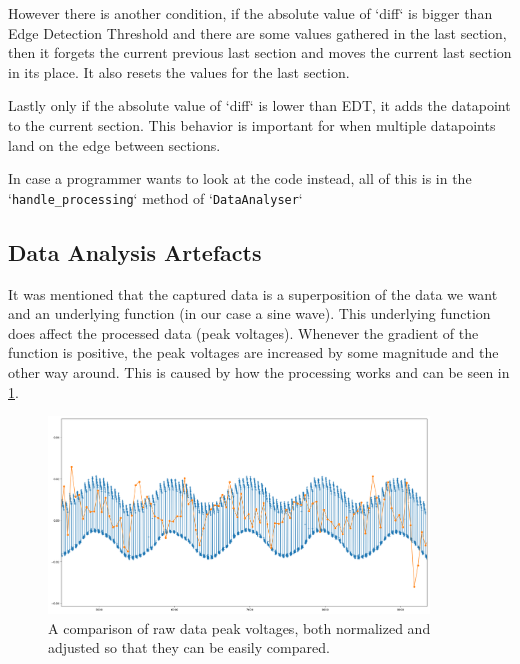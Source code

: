 \documentclass[a4paper, 10pt]{article}
\begin{document}
However there is another condition, if the absolute value of `diff` is bigger than Edge Detection Threshold and there are some values gathered in the last section, then it forgets the current previous last section and moves the current last section in its place.
It also resets the values for the last section.

Lastly only if the absolute value of `diff` is lower than EDT, it adds the datapoint to the current section.
This behavior is important for when multiple datapoints land on the edge between sections.

In case a programmer wants to look at the code instead, all of this is in the `\lstinline{handle_processing}` method of `\lstinline{DataAnalyser}`

\subsection{Data Analysis Artefacts}
It was mentioned that the captured data is a superposition of the data we want and an underlying function (in our case a sine wave).
This underlying function does affect the processed data (peak voltages).
Whenever the gradient of the function is positive, the peak voltages are increased by some magnitude and the other way around.
This is caused by how the processing works and can be seen in \cref{fig:soft-ys-pys-corr}.

\begin{figure}[H]
    \centering
    \includegraphics[width=0.9\textwidth]{../images/soft-ys-pys-corr.png}
    \caption{A comparison of raw data peak voltages, both normalized and adjusted so that they can be easily compared.}
    \label{fig:soft-ys-pys-corr}
\end{figure}

\newpage
\end{document}
